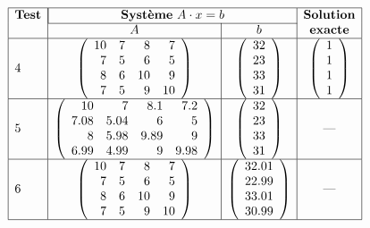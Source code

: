 $$\begin{array}{|l|c|c|c|}
\hline
\mbox{\bf Test} & \multicolumn{2}{|c|}{\mbox{{\bf Système} $A\cdot x = b$}} & \bf Solution\\
\cline{2-3}
                & A & b & \bf exacte \\
\hline
4 &
\left(\begin{array}{rrrr}
10 & 7 & 8 & 7 \\
7 & 5 & 6 & 5 \\
8 & 6 & 10 & 9 \\
7 & 5 & 9 & 10
\end{array}\right) 
&
\left(\begin{array}{r}
32 \\ 23 \\ 33 \\ 31
\end{array}\right) 
&
\left(\begin{array}{r}
1 \\ 1 \\ 1 \\ 1
\end{array}\right) 
\\
\hline
5 & 
\left(\begin{array}{rrrr}
10 & 7 & 8.1 & 7.2 \\
7.08 & 5.04 & 6 & 5 \\
8 & 5.98 & 9.89 & 9 \\
6.99 & 4.99 & 9 & 9.98
\end{array}\right) 
&
\left(\begin{array}{r}
32 \\ 23 \\ 33 \\ 31
\end{array}\right) 
&
\mbox{---} \\
\hline
6 &
\left(\begin{array}{rrrr}
10 & 7 & 8 & 7 \\
7 & 5 & 6 & 5 \\
8 & 6 & 10 & 9 \\
7 & 5 & 9 & 10
\end{array}\right) 
&
\left(\begin{array}{r}
32.01 \\ 22.99 \\ 33.01 \\ 30.99
\end{array}\right) 
&
\mbox{---} \\
\hline
\end{array}$$

